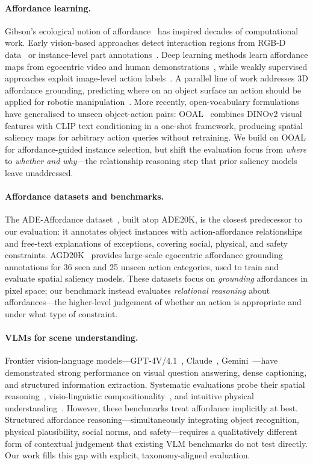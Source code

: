 \documentclass[runningheads]{llncs}
\begin{document}
\paragraph{Affordance learning.}
Gibson's ecological notion of affordance~\cite{gibson1979ecological} has
inspired decades of computational work. Early vision-based approaches
detect interaction regions from RGB-D data~\cite{myers2015affordance} or
instance-level part annotations~\cite{nguyen2017object}. Deep learning
methods learn affordance maps from egocentric video and human
demonstrations~\cite{fang2018demo2vec,hotspots2019}, while weakly
supervised approaches exploit image-level action labels~\cite{luo2022grounded}.
A parallel line of work addresses 3D affordance grounding, predicting
where on an object surface an action should be applied for robotic
manipulation~\cite{deng20213d}. More recently, open-vocabulary
formulations have generalised to unseen object-action pairs: OOAL~\cite{ooal}
combines DINOv2 visual features with CLIP text conditioning in a one-shot
framework, producing spatial saliency maps for arbitrary action queries
without retraining. We build on OOAL for affordance-guided instance
selection, but shift the evaluation focus from \emph{where} to \emph{whether
and why}—the relationship reasoning step that prior saliency models leave
unaddressed.

\paragraph{Affordance datasets and benchmarks.}
The ADE-Affordance dataset~\cite{ade_affordance}, built atop ADE20K, is
the closest predecessor to our evaluation: it annotates object instances
with action-affordance relationships and free-text explanations of
exceptions, covering social, physical, and safety constraints. AGD20K~\cite{ooal}
provides large-scale egocentric affordance grounding annotations for 36
seen and 25 unseen action categories, used to train and evaluate spatial
saliency models. These datasets focus on \emph{grounding} affordances in
pixel space; our benchmark instead evaluates \emph{relational reasoning}
about affordances—the higher-level judgement of whether an action is
appropriate and under what type of constraint.

\paragraph{VLMs for scene understanding.}
Frontier vision-language models—GPT-4V/4.1~\cite{gpt4},
Claude~\cite{claude}, Gemini~\cite{gemini}—have demonstrated strong
performance on visual question answering, dense captioning, and structured
information extraction. Systematic evaluations probe their spatial
reasoning~\cite{spatialvlm}, visio-linguistic compositionality~\cite{winoground},
and intuitive physical understanding~\cite{physion}. However, these
benchmarks treat affordance implicitly at best. Structured affordance
reasoning—simultaneously integrating object recognition, physical
plausibility, social norms, and safety—requires a qualitatively different
form of contextual judgement that existing VLM benchmarks do not
test directly. Our work fills this gap with explicit, taxonomy-aligned
evaluation.
\end{document}
